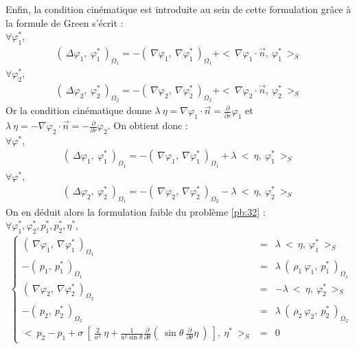 \documentclass[a4paper]{report}
\begin{document}
Enfin, la condition cinématique est introduite au sein de cette formulation grâce à la formule de Green s'écrit :
\\[0.25cm]
$\forall \varphi^*_1$,
\begin{eqnarray*}
(\ \Delta \varphi_1 ,\ \varphi^*_1 \ )_{\Omega_1} = - (\ \nabla \varphi_1 ,\ \nabla \varphi^*_1 \ )_{\Omega_1} + <\ \nabla \varphi_1 \cdot \vec{n},\ \varphi^*_1 \ >_S
\end{eqnarray*}
$\forall \varphi^*_2$,
\begin{eqnarray*}
(\ \Delta \varphi_2 ,\ \varphi^*_2 \ )_{\Omega_2} = - (\ \nabla \varphi_2 ,\ \nabla \varphi^*_2 \ )_{\Omega_2} + <\ \nabla \varphi_2 \cdot \vec{n},\ \varphi^*_2 \ >_S
\end{eqnarray*}
Or la condition cinématique donne $\lambda\ \eta = \nabla \varphi_1 \cdot \vec{n} = \frac{\partial}{\partial r} \varphi_1$ et $\lambda\ \eta = - \nabla \varphi_2 \cdot \vec{n} = - \frac{\partial}{\partial r} \varphi_2$. On obtient donc :
\\[0.25cm]
$\forall \varphi^*$,
\begin{eqnarray*}
(\ \Delta \varphi_1 ,\ \varphi^*_1 \ )_{\Omega_1} = - (\ \nabla \varphi_1 ,\ \nabla \varphi^*_1 \ )_{\Omega_1} + \lambda\ <\ \eta,\ \varphi^*_1 \ >_S
\end{eqnarray*}
$\forall \varphi^*$,
\begin{eqnarray*}
(\ \Delta \varphi_2 ,\ \varphi^*_2 \ )_{\Omega_1} = - (\ \nabla \varphi_2 ,\ \nabla \varphi^*_2 \ )_{\Omega_2} - \lambda\ <\ \eta,\ \varphi^*_2 \ >_S
\end{eqnarray*}
On en déduit alors la formulation faible du problème \eqref{pb:32} :
\\[0.25cm]
$\forall \varphi^*_1, \varphi^*_2, p^*_1, p^*_2, \eta^*$,
\begin{eqnarray}\label{pb:33}
\left\{
\begin{array}{rcl}
(\ \nabla \varphi_1 ,\ \nabla \varphi^*_1 \ )_{\Omega_1} &=& \lambda\ <\ \eta,\ \varphi^*_1 \ >_S \\
- (\ p_1 ,\ p^*_1 \ )_{\Omega_1} &=& \lambda\ (\ \rho_1\ \varphi_1 ,\ p^*_1 \ )_{\Omega_1} \\
(\ \nabla \varphi_2 ,\ \nabla \varphi^*_2 \ )_{\Omega_2} &=& - \lambda\ <\ \eta,\ \varphi^*_2 \ >_S \\
- (\ p_2 ,\ p^*_2 \ )_{\Omega_2} &=& \lambda\ (\ \rho_2\ \varphi_2 ,\ p^*_2 \ )_{\Omega_2} \\
<\ p_2 - p_1 + \sigma\ \left[\ \frac{2}{a^2} \ \eta
                       + \frac{1}{a^2 \sin\theta} \frac{\partial}{\partial \theta}(\ \sin\theta \ \frac{\partial}{\partial \theta} \eta \ )\ \right] ,\ \eta^* \ >_S &=& 0
\end{array}
\right.
\end{eqnarray}
\end{document}
